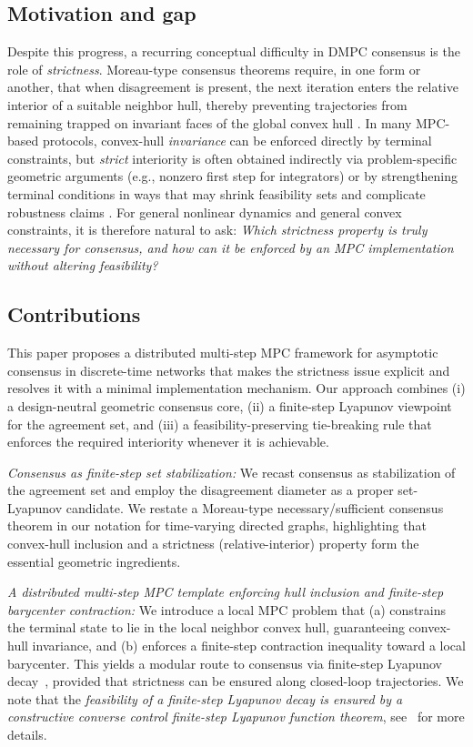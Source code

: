 \documentclass[12pt,draftcls,onecolumn]{IEEEtran}
\begin{document}
\subsection{Motivation and gap}
Despite this progress, a recurring conceptual difficulty in DMPC consensus is the role of \emph{strictness}.
Moreau-type consensus theorems require, in one form or another, that when disagreement is present, the next iteration enters the relative interior of a suitable neighbor hull, thereby preventing trajectories from remaining trapped on invariant faces of the global convex hull \cite{Moreau.2005}.
In many MPC-based protocols, convex-hull \emph{invariance} can be enforced directly by terminal constraints, but \emph{strict} interiority is often obtained indirectly via problem-specific geometric arguments (e.g., nonzero first step for integrators) or by strengthening terminal conditions in ways that may shrink feasibility sets and complicate robustness claims \cite{Ferrari-Trecate.2009}.
For general nonlinear dynamics and general convex constraints, it is therefore natural to ask:
\emph{Which strictness property is truly necessary for consensus, and how can it be enforced by an MPC implementation without altering feasibility?}

\subsection{Contributions}
This paper proposes a distributed multi-step MPC framework for asymptotic consensus in discrete-time networks that makes the strictness issue explicit and resolves it with a minimal implementation mechanism.
Our approach combines (i) a design-neutral geometric consensus core, (ii) a finite-step Lyapunov viewpoint for the agreement set, and (iii) a feasibility-preserving tie-breaking rule that enforces the required interiority whenever it is achievable.

\emph{Consensus as finite-step set stabilization:}
We recast consensus as stabilization of the agreement set and employ the disagreement diameter as a proper set-Lyapunov candidate.
We restate a Moreau-type necessary/sufficient consensus theorem in our notation for time-varying directed graphs, highlighting that convex-hull inclusion and a strictness (relative-interior) property form the essential geometric ingredients.

\emph{A distributed multi-step MPC template enforcing hull inclusion and finite-step barycenter contraction:}
We introduce a local MPC problem that (a) constrains the terminal state to lie in the local neighbor convex hull, guaranteeing convex-hull invariance, and (b) enforces a finite-step contraction inequality toward a local barycenter.
This yields a modular route to consensus via finite-step Lyapunov decay~\cite{Geiselhart.2014c}, provided that strictness can be ensured along closed-loop trajectories.
We note that the \emph{feasibility of a finite-step Lyapunov decay is ensured by a constructive converse control finite-step Lyapunov function theorem}, see~\cite{Noroozi.2020} for more details.
\end{document}
